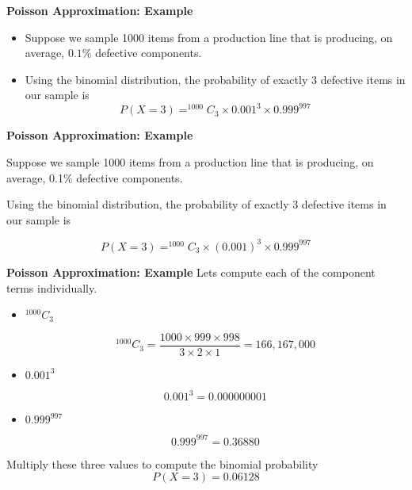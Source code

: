 \documentclass[a4paper,12pt]{article}
\begin{document}

\textbf{Poisson Approximation: Example}

\begin{itemize}
\item Suppose we sample 1000 items from a production line that is producing, on
average, $0.1\%$ defective components.
\item Using the binomial distribution, the probability of exactly 3 defective items in
our sample is
\[P(X = 3) = ^{1000}C_{3} \times 0.001^{3} \times 0.999^{997}\]
\end{itemize}
\medskip
{
\textbf{Poisson Approximation: Example}

Suppose we sample 1000 items from a production line that is producing, on average, 0.1\% defective components.\\


\bigskip

Using the binomial distribution, the probability of exactly 3 defective items in our sample is

\[P(X=3) = ^{1000}C_3 \times (0.001)^3 \times 0.999^{997} \]

}
{
\textbf{Poisson Approximation: Example}
Lets compute each of the component terms individually.


\begin{itemize}
\item $^{1000}C_3$

\[ ^{1000}C_3 = \frac{1000 \times 999 \times 998}{3 \times 2 \times 1} =
166,167,000 \]

\item $0.001^3$

\[0.001^3 = 0.000000001 \]


\item $0.999^{997}$

\[0.999^{997} = 0.36880 \]

\end{itemize}
Multiply these three values to compute the binomial probability \[P(X=3) = 0.06128 \]

}
\end{document}
